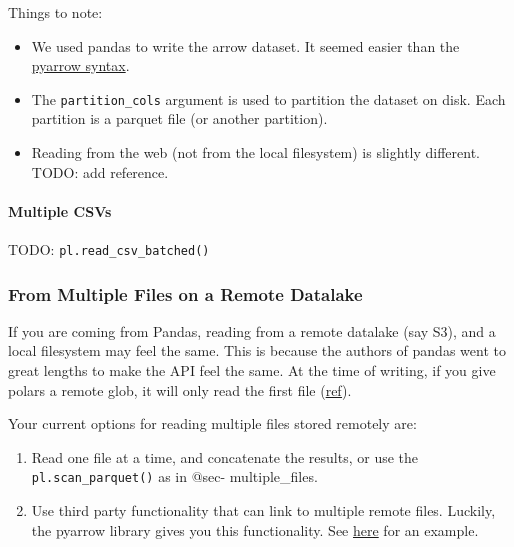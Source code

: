 \documentclass[
  letterpaper,
  DIV=11,
  numbers=noendperiod]{scrartcl}
\let\oldparagraph\paragraph
\renewcommand{\paragraph}[1]{\oldparagraph{#1}\mbox{}}
\providecommand{\tightlist}{%
  \setlength{\itemsep}{0pt}\setlength{\parskip}{0pt}}\usepackage{longtable,booktabs,array}
\begin{document}
Things to note:

\begin{itemize}
\tightlist
\item
  We used pandas to write the arrow dataset. It seemed easier than the
  \href{https://arrow.apache.org/docs/python/dataset.html\#dataset}{pyarrow
  syntax}.
\item
  The \texttt{partition\_cols} argument is used to partition the dataset
  on disk. Each partition is a parquet file (or another partition).
\item
  Reading from the web (not from the local filesystem) is slightly
  different. TODO: add reference.
\end{itemize}

\hypertarget{multiple-csvs}{%
\paragraph{Multiple CSVs}\label{multiple-csvs}}

TODO: \texttt{pl.read\_csv\_batched()}

\hypertarget{from-multiple-files-on-a-remote-datalake}{%
\subsubsection{From Multiple Files on a Remote
Datalake}\label{from-multiple-files-on-a-remote-datalake}}

If you are coming from Pandas, reading from a remote datalake (say S3),
and a local filesystem may feel the same. This is because the authors of
pandas went to great lengths to make the API feel the same. At the time
of writing, if you give polars a remote glob, it will only read the
first file (\href{https://github.com/pola-rs/polars/issues/5863}{ref}).

Your current options for reading multiple files stored remotely are:

\begin{enumerate}
\def\labelenumi{\arabic{enumi}.}
\tightlist
\item
  Read one file at a time, and concatenate the results, or use the
  \texttt{pl.scan\_parquet()} as in @sec- multiple\_files.
\item
  Use third party functionality that can link to multiple remote files.
  Luckily, the pyarrow library gives you this functionality. See
  \href{https://pola-rs.github.io/polars-book/user-guide/howcani/io/aws.html}{here}
  for an example.
\end{enumerate}
\end{document}
